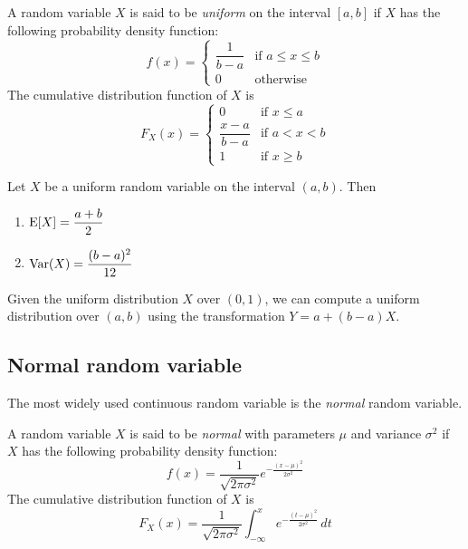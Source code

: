 \documentclass{article}
\begin{document}
\begin{definition}
  A random variable $X$ is said to be \emph{uniform} on the interval $[a, b]$ if $X$ has the following probability density function:
  \[
    f(x) = \begin{cases}
      \dfrac{1}{b - a} & \text{if } a \leq x \leq b \\
      0                & \text{otherwise}
    \end{cases}
  \]
  The cumulative distribution function of $X$ is
  \[
    F_X(x) = \begin{cases}
      0                    & \text{if } x \leq a  \\
      \dfrac{x - a}{b - a} & \text{if } a < x < b \\
      1                    & \text{if } x \geq b
    \end{cases}
  \]
\end{definition}

\begin{proposition}
  Let $X$ be a uniform random variable on the interval $(a, b)$.
  Then
  \begin{enumerate}
    \item $\operatorname{E}[X] = \dfrac{a + b}{2}$
    \item $\operatorname{Var}(X) = \dfrac{(b - a)^2}{12}$
  \end{enumerate}
\end{proposition}

\begin{remark}
  Given the uniform distribution $X$ over $(0, 1)$, we can compute a uniform distribution over $(a, b)$ using the transformation $Y = a + (b - a) X$.
\end{remark}

\subsection{Normal random variable}

The most widely used continuous random variable is the \emph{normal} random variable.

\begin{definition}
  A random variable $X$ is said to be \emph{normal} with parameters $\mu$ and variance $\sigma^2$ if $X$ has the following probability density function:
  \[
    f(x) = \frac{1}{\sqrt{2 \pi \sigma^2}} e^{-\frac{(x - \mu)^2}{2 \sigma^2}}
  \]
  The cumulative distribution function of $X$ is
  \[
    F_X(x) = \frac{1}{\sqrt{2 \pi \sigma^2}} \int_{-\infty}^x e^{-\frac{(t - \mu)^2}{2 \sigma^2}} \, dt
  \]
\end{definition}
\end{document}
